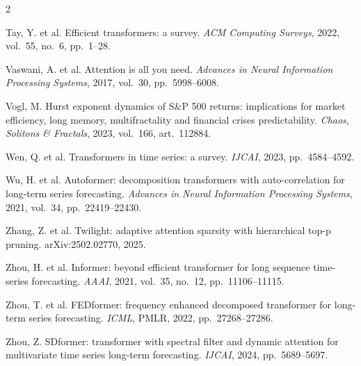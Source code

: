 \documentclass[a4paper,10pt,twoside]{article}
\begin{document}
\begin{multicols}{2}
{\item Tay, Y. et al. Efficient transformers: a survey. \textit{ACM Computing Surveys}, 2022, vol.~55, no.~6, pp.~1--28.
\item Vaswani, A. et al. Attention is all you need. \textit{Advances in Neural Information Processing Systems}, 2017, vol.~30, pp.~5998--6008.
\item Vogl, M. Hurst exponent dynamics of S\&P 500 returns: implications for market efficiency, long memory, multifractality and financial crises predictability. \textit{Chaos, Solitons \& Fractals}, 2023, vol.~166, art.~112884.
\item Wen, Q. et al. Transformers in time series: a survey. \textit{IJCAI}, 2023, pp.~4584--4592.
\item Wu, H. et al. Autoformer: decomposition transformers with auto-correlation for long-term series forecasting. \textit{Advances in Neural Information Processing Systems}, 2021, vol.~34, pp.~22419--22430.
\item Zhang, Z. et al. Twilight: adaptive attention sparsity with hierarchical top-p pruning. arXiv:2502.02770, 2025.
\item Zhou, H. et al. Informer: beyond efficient transformer for long sequence time-series forecasting. \textit{AAAI}, 2021, vol.~35, no.~12, pp.~11106--11115.
\item Zhou, T. et al. FEDformer: frequency enhanced decomposed transformer for long-term series forecasting. \textit{ICML}, PMLR, 2022, pp.~27268--27286.
\item Zhou, Z. SDformer: transformer with spectral filter and dynamic attention for multivariate time series long-term forecasting. \textit{IJCAI}, 2024, pp.~5689--5697.
}

\end{multicols}
\end{document}
